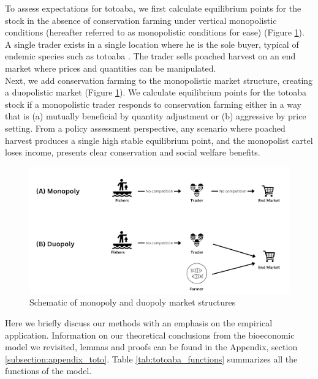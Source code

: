 To assess expectations for totoaba, we first calculate equilibrium points for the stock in the absence of conservation farming under vertical monopolistic conditions (hereafter referred to as monopolistic conditions for ease) (Figure \ref{fig:figure3}). A single trader exists in a single location where he is the sole buyer, typical of endemic species such as totoaba \citep{wyatt_differentiating_2020, martinez-alvarado_trafficking_2018}. The trader sells poached harvest on an end market where prices and quantities can be manipulated. 
\\
Next, we add conservation farming to the monopolistic market structure, creating a duopolistic market (Figure \ref{fig:figure3}). We calculate equilibrium points for the totoaba stock if a monopolistic trader responds to conservation farming either in a way that is (a) mutually beneficial by quantity adjustment or (b) aggressive by price setting. From a policy assessment perspective, any scenario where poached harvest produces a single high stable equilibrium point, and the monopolist cartel loses income, presents clear conservation and social welfare benefits.

\begin{figure}[h]
    \centering
    \includegraphics[width=0.85\linewidth]{figures/totoaba/schematic_market.png}
    \caption{Schematic of monopoly and duopoly market structures}
    \label{fig:figure3}
\end{figure}

Here we briefly discuss our methods with an emphasis on the empirical application. Information on our theoretical conclusions from the bioeconomic model we revisited, lemmas and proofs can be found in the Appendix, section \ref{subsection:appendix_toto}. Table \ref{tab:totoaba_functions} summarizes all the functions of the model.  

